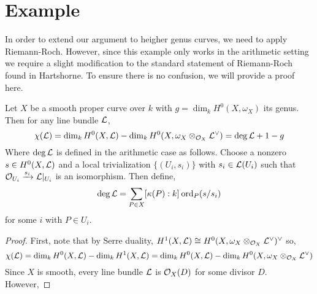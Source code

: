 \documentclass[12pt]{article}
\begin{document}
\section{Example}

In order to extend our argument to heigher genus curves, we need to apply Riemann-Roch. However, since this example only works in the arithmetic setting we require a slight modification to the standard statement of Riemann-Roch found in Hartshorne. To ensure there is no confusion, we will provide a proof here.

\begin{theorem}
Let $X$ be a smooth proper curve over $k$ with $g = \dim_k H^0(X, \omega_X)$ its genus. Then for any line bundle $\mathcal{L}$,
\[ \chi(\mathcal{L}) = \dim_k H^0(X, \mathcal{L}) - \dim_k H^0(X, \omega_X \otimes_{\mathcal{O}_{X}} \mathcal{L}^\vee) = \deg{\mathcal{L}} + 1 - g \]
Where $\deg{\mathcal{L}}$ is defined in the arithmetic case as follows. Choose a nonzero $s \in H^0(X, \mathcal{L})$ and a local trivialization $\{ (U_i, s_i) \}$ with $s_i \in \mathcal{L}(U_i)$ such that $\mathcal{O}_{U_i} \xrightarrow{s_i} \mathcal{L}|_{U_i}$ is an isomorphism. Then define,
\[ \deg{\mathcal{L}} = \sum_{P \in X} [\kappa(P) : k] \: \mathrm{ord}_{P}(s/s_i) \] 
for some $i$ with $P \in U_i$. 
\end{theorem}

\begin{proof}
First, note that by Serre duality, $H^1(X, \mathcal{L}) \cong H^0(X, \omega_X \otimes_{\mathcal{O}_{X}} \mathcal{L}^\vee)^\vee$ so,
\[ \chi(\mathcal{L}) = \dim_k H^0(X, \mathcal{L}) - \dim_k H^1(X, \mathcal{L}) = \dim_k H^0(X, \mathcal{L}) - \dim_k H^0(X, \omega_X \otimes_{\mathcal{O}_{X}} \mathcal{L}^\vee) \]
Since $X$ is smooth, every line bundle $\mathcal{L}$ is $\mathcal{O}_{X}(D)$ for some divisor $D$. However,
\end{proof}
\end{document}

